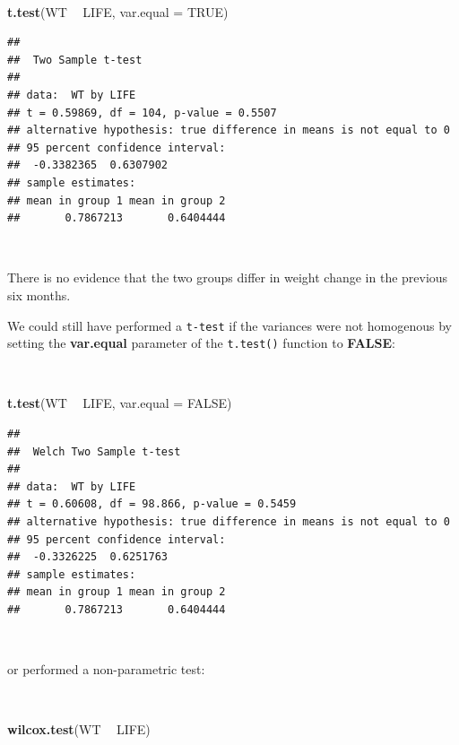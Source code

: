 \documentclass[12pt,a4paper]{book}
\newenvironment{Shaded}{\begin{snugshade}}{\end{snugshade}}
\newcommand{\DataTypeTok}[1]{\textcolor[rgb]{0.13,0.29,0.53}{#1}}
\newcommand{\KeywordTok}[1]{\textcolor[rgb]{0.13,0.29,0.53}{\textbf{#1}}}
\newcommand{\NormalTok}[1]{#1}
\newcommand{\OperatorTok}[1]{\textcolor[rgb]{0.81,0.36,0.00}{\textbf{#1}}}
\newcommand{\OtherTok}[1]{\textcolor[rgb]{0.56,0.35,0.01}{#1}}
\newcommand{\StringTok}[1]{\textcolor[rgb]{0.31,0.60,0.02}{#1}}
\theoremstyle{definition}
\theoremstyle{definition}
\theoremstyle{definition}
\theoremstyle{remark}
\begin{document}
~

\begin{Shaded}
\begin{Highlighting}[]
\KeywordTok{t.test}\NormalTok{(WT }\OperatorTok{~}\StringTok{ }\NormalTok{LIFE, }\DataTypeTok{var.equal =} \OtherTok{TRUE}\NormalTok{)}
\end{Highlighting}
\end{Shaded}

\begin{verbatim}
## 
##  Two Sample t-test
## 
## data:  WT by LIFE
## t = 0.59869, df = 104, p-value = 0.5507
## alternative hypothesis: true difference in means is not equal to 0
## 95 percent confidence interval:
##  -0.3382365  0.6307902
## sample estimates:
## mean in group 1 mean in group 2 
##       0.7867213       0.6404444
\end{verbatim}

~

There is no evidence that the two groups differ in weight change in the
previous six months.

We could still have performed a \texttt{t-test} if the variances were
not homogenous by setting the \textbf{var.equal} parameter of the
\texttt{t.test()} function to \textbf{FALSE}:

~

\begin{Shaded}
\begin{Highlighting}[]
\KeywordTok{t.test}\NormalTok{(WT }\OperatorTok{~}\StringTok{ }\NormalTok{LIFE, }\DataTypeTok{var.equal =} \OtherTok{FALSE}\NormalTok{)}
\end{Highlighting}
\end{Shaded}

\begin{verbatim}
## 
##  Welch Two Sample t-test
## 
## data:  WT by LIFE
## t = 0.60608, df = 98.866, p-value = 0.5459
## alternative hypothesis: true difference in means is not equal to 0
## 95 percent confidence interval:
##  -0.3326225  0.6251763
## sample estimates:
## mean in group 1 mean in group 2 
##       0.7867213       0.6404444
\end{verbatim}

~

or performed a non-parametric test:

~

\begin{Shaded}
\begin{Highlighting}[]
\KeywordTok{wilcox.test}\NormalTok{(WT }\OperatorTok{~}\StringTok{ }\NormalTok{LIFE)}
\end{Highlighting}
\end{Shaded}
\end{document}
